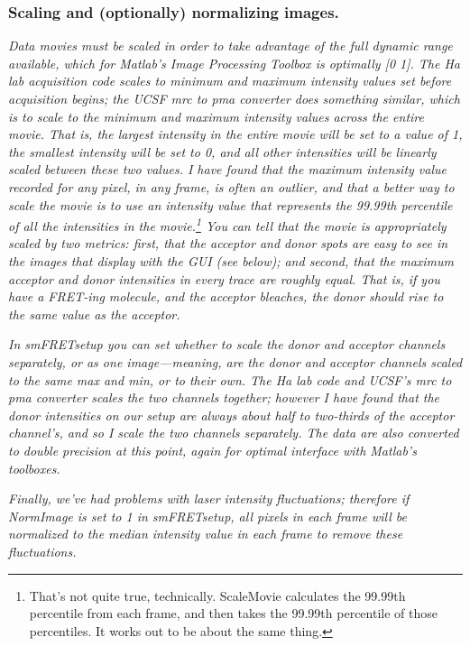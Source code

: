 \documentclass[11pt]{article}
\begin{document}
\subsubsection{Scaling and (optionally) normalizing images.}

{\it Data movies must be scaled in order to take advantage of the full dynamic range available, which for Matlab's Image Processing Toolbox is optimally [0 1].  The Ha lab acquisition code scales to minimum and maximum intensity values set before acquisition begins; the UCSF mrc to pma converter does something similar, which is to scale to the minimum and maximum intensity values across the entire movie.  That is, the largest intensity in the entire movie will be set to a value of 1, the smallest intensity will be set to 0, and all other intensities will be linearly scaled between these two values.  I have found that the maximum intensity value recorded for any pixel, in any frame, is often an outlier, and that a better way to scale the movie is to use an intensity value that represents the 99.99th percentile of all the intensities in the movie.\footnote{That's not quite true, technically.  ScaleMovie calculates the 99.99th percentile from each frame, and then takes the 99.99th percentile of those percentiles.  It works out to be about the same thing.}  You can tell that the movie is appropriately scaled by two metrics: first, that the acceptor and donor spots are easy to see in the images that display with the GUI (see below); and second, that the maximum acceptor and donor intensities in every trace are roughly equal.  That is, if you have a FRET-ing molecule, and the acceptor bleaches, the donor should rise to the same value as the acceptor.}

{\it In smFRETsetup you can set whether to scale the donor and acceptor channels separately, or as one image---meaning, are the donor and acceptor channels scaled to the same max and min, or to their own.  The Ha lab code and UCSF's mrc to pma converter scales the two channels together; however I have found that the donor intensities on our setup are always about half to two-thirds of the acceptor channel's, and so I scale the two channels separately. The data are also converted to double precision at this point, again for optimal interface with Matlab's toolboxes. }

{\it Finally, we've had problems with laser intensity fluctuations; therefore if NormImage is set to 1 in smFRETsetup, all pixels in each frame will be normalized to the median intensity value in each frame to remove these fluctuations.} \\
\end{document}
